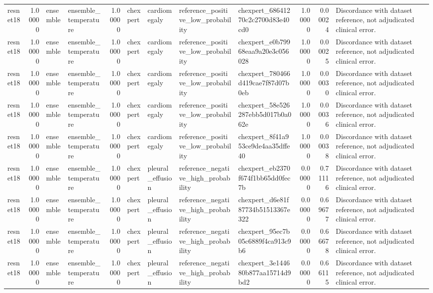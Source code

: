 \begin{tabular}{lrllrllllrrl}
resnet18 & 1.00000 & ensemble & ensemble\_temperature & 1.00000 & chexpert & cardiomegaly & reference\_positive\_low\_probability & chexpert\_68641270c2c2700d83e40cd0 & 1.00000 & 0.00024 & Discordance with dataset reference, not adjudicated clinical error. \\
resnet18 & 1.00000 & ensemble & ensemble\_temperature & 1.00000 & chexpert & cardiomegaly & reference\_positive\_low\_probability & chexpert\_e0b79968eaa9a20e3c056028 & 1.00000 & 0.00025 & Discordance with dataset reference, not adjudicated clinical error. \\
resnet18 & 1.00000 & ensemble & ensemble\_temperature & 1.00000 & chexpert & cardiomegaly & reference\_positive\_low\_probability & chexpert\_780466d419cae7f87d07b0eb & 1.00000 & 0.00030 & Discordance with dataset reference, not adjudicated clinical error. \\
resnet18 & 1.00000 & ensemble & ensemble\_temperature & 1.00000 & chexpert & cardiomegaly & reference\_positive\_low\_probability & chexpert\_58e526287ebb5d017b0a062e & 1.00000 & 0.00036 & Discordance with dataset reference, not adjudicated clinical error. \\
resnet18 & 1.00000 & ensemble & ensemble\_temperature & 1.00000 & chexpert & cardiomegaly & reference\_positive\_low\_probability & chexpert\_8f41a953ce9de4aa35dffe40 & 1.00000 & 0.00038 & Discordance with dataset reference, not adjudicated clinical error. \\
resnet18 & 1.00000 & ensemble & ensemble\_temperature & 1.00000 & chexpert & pleural\_effusion & reference\_negative\_high\_probability & chexpert\_eb2370f674f1bb65dd0fec7b & 0.00000 & 0.71116 & Discordance with dataset reference, not adjudicated clinical error. \\
resnet18 & 1.00000 & ensemble & ensemble\_temperature & 1.00000 & chexpert & pleural\_effusion & reference\_negative\_high\_probability & chexpert\_d6e81f87734b51513367e322 & 0.00000 & 0.69677 & Discordance with dataset reference, not adjudicated clinical error. \\
resnet18 & 1.00000 & ensemble & ensemble\_temperature & 1.00000 & chexpert & pleural\_effusion & reference\_negative\_high\_probability & chexpert\_95ec7b05c6889f4ca913c9b6 & 0.00000 & 0.66678 & Discordance with dataset reference, not adjudicated clinical error. \\
resnet18 & 1.00000 & ensemble & ensemble\_temperature & 1.00000 & chexpert & pleural\_effusion & reference\_negative\_high\_probability & chexpert\_3e144680b877aa15714d9bd2 & 0.00000 & 0.66115 & Discordance with dataset reference, not adjudicated clinical error. \\

\end{tabular}

